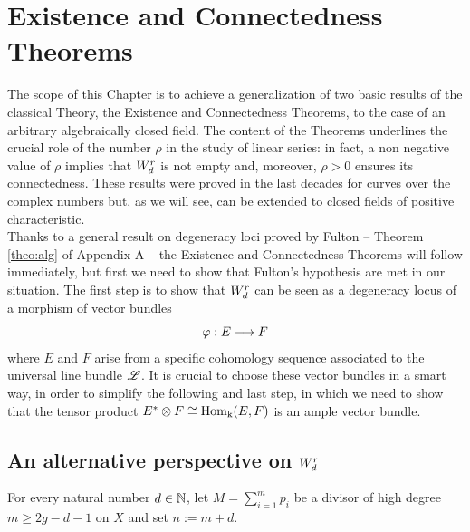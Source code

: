 
\chapter{Existence and Connectedness Theorems} %



\ifpdf
    \graphicspath{{figures/}{figures/}{figures/}}
\else
    \graphicspath{{figures/}{figures/}}
\fi



The scope of this Chapter is to achieve a generalization of two basic results of the classical \BN Theory, the Existence and Connectedness Theorems, to the case of an arbitrary algebraically closed field. The content of the Theorems underlines the crucial role of the \BN number $\rho$ in the study of linear series: in fact, a non negative value of $\rho$ implies that $W_d^r$ is not empty and, moreover, $\rho>0$ ensures its connectedness.
These results were proved in the last decades for curves over the complex numbers but, as we will see, can be extended to closed fields of positive characteristic.\\
Thanks to a general result on degeneracy loci proved by Fulton -- Theorem \ref{theo:alg} of Appendix A -- the Existence and Connectedness Theorems will follow immediately, but first we need to show that Fulton's hypothesis are met in our situation. The first step is to show that $W_d^r$ can be seen as a degeneracy locus of a morphism of vector bundles
$$ \varphi: E\longrightarrow F $$
where $E$ and $F$ arise from a specific cohomology sequence associated to the universal line bundle $\mathscr{L}$. It is crucial to choose these vector bundles in a smart way, in order to simplify the following and last step, in which we need to show that the tensor product $E^*\otimes F \cong \operatorname{Hom_k}(E,F)$ is an ample vector bundle.

\section{An alternative perspective on $W_d^r$}\label{sec:alternative}

	\begin{notation}
		For every natural number $d\in \mathbb{N}$, let $M=\sum_{i=1}^m p_i$ be a divisor of high degree $m\geq2g-d-1$ on $X$ and set $n:=m+d$.
	\end{notation}	
	
